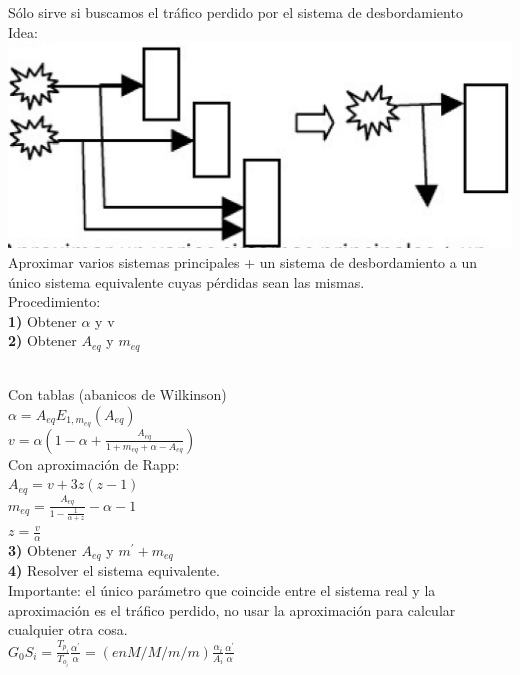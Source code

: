 \begin{minipage}{.22\textwidth}
	Sólo sirve si buscamos el tráfico perdido por el sistema de desbordamiento \\
	Idea: \\
	\includegraphics[scale=0.18]{modelotraficoequivalente.png} \\
	Aproximar varios sistemas principales + un sistema de desbordamiento a un único sistema equivalente cuyas pérdidas sean las mismas.\\
	Procedimiento: \\
	{\bf 1)} Obtener $\alpha$ y v\\
	{\bf 2)} Obtener $A_{eq}$ y $m_{eq}$\\ \\
\end{minipage}
\vfill\null
\columnbreak
\begin{minipage}{.22\textwidth}
	Con tablas (abanicos de Wilkinson) \\
	$\alpha=A_{eq}E_{1,m_{eq}}(A_{eq})$ \\
	$v=\alpha(1-\alpha+\frac{A_{eq}}{1+m_{eq}+\alpha-A_{eq}})$\\
	Con aproximación de Rapp: \\
	$A_{eq}=v+3z(z-1)$\\
	$m_{eq}=\frac{A_{eq}}{1-\frac{1}{\alpha+z}}-\alpha-1$ \\
	$z=\frac{v}{\alpha}$ \\
	{\bf 3)} Obtener $A_{eq}$ y $m^{'}+m_{eq}$ \\
	{\bf 4)} Resolver el sistema equivalente. \\
	Importante: el único parámetro que coincide entre el sistema real y la aproximación es el tráfico perdido, no usar la aproximación para calcular cualquier otra cosa. \\
	$G_0{S_i}=\frac{T_{p_i}}{T_{o_i}}\frac{\alpha^{'}}{\alpha}=(en M/M/m/m)\frac{\alpha_i}{A_i}\frac{\alpha^{'}}{\alpha}$
\end{minipage}

